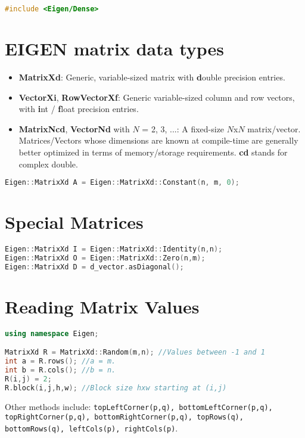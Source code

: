 \documentclass[12pt]{article}
\author{\authorVar}
\title{\titleVar}
\date{\dateVar}
\newcommand{\tocr}{
\renewcommand\cftaftertoctitle{\par\noindent\hrulefill\par\vskip-0.65em}
\tableofcontents
\noindent\hrulefill
}
\begin{document}
\maketitle

\begin{lstlisting}[language=c++]
#include <Eigen/Dense>
\end{lstlisting}

\tocr

\thispagestyle{fancy}

\section{EIGEN matrix data types}
\begin{itemize}
\item \textbf{MatrixXd}: Generic, variable-sized matrix with \textbf{d}ouble precision entries.
\item \textbf{VectorXi}, \textbf{RowVectorXf}: Generic variable-sized column and row vectors, with \textbf{i}nt / \textbf{f}loat precision entries.
\item \textbf{MatrixNcd}, \textbf{VectorNd} with $N$ = 2, 3, ...: A fixed-size $N$x$N$ matrix/vector. Matrices/Vectors whose dimensions are known at compile-time are generally better optimized in terms of memory/storage requirements. \textbf{cd} stands for complex double.
\end{itemize}
\begin{lstlisting}[language=c++]
Eigen::MatrixXd A = Eigen::MatrixXd::Constant(n, m, 0);
\end{lstlisting}
\section{Special Matrices}
\begin{lstlisting}[language=c++]
Eigen::MatrixXd I = Eigen::MatrixXd::Identity(n,n);
Eigen::MatrixXd O = Eigen::MatrixXd::Zero(n,m);
Eigen::MatrixXd D = d_vector.asDiagonal();
\end{lstlisting}
\section{Reading Matrix Values}
\begin{lstlisting}[language=c++]
using namespace Eigen;

MatrixXd R = MatrixXd::Random(m,n); //Values between -1 and 1
int a = R.rows(); //a = m.
int b = R.cols(); //b = n.
R(i,j) = 2;
R.block(i,j,h,w); //Block size hxw starting at (i,j)
\end{lstlisting}
Other methods include: \texttt{topLeftCorner(p,q), bottomLeftCorner(p,q), topRightCorner(p,q), bottomRightCorner(p,q), topRows(q), bottomRows(q), leftCols(p), rightCols(p)}.
\end{document}
